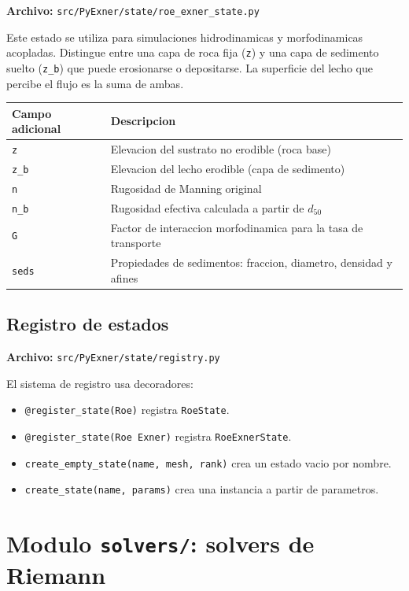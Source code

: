 \documentclass[11pt,a4paper]{article}
\newcommand{\code}[1]{\texttt{#1}}
\begin{document}
\textbf{Archivo:} \code{src/PyExner/state/roe\_exner\_state.py}

Este estado se utiliza para simulaciones hidrodinamicas y morfodinamicas acopladas. Distingue
entre una capa de roca fija (\code{z}) y una capa de sedimento suelto (\code{z\_b}) que puede
erosionarse o depositarse. La superficie del lecho que percibe el flujo es la suma de ambas.

\begin{longtable}{L{3.4cm}L{11cm}}
\toprule
Campo adicional & Descripcion \\
\midrule
\endhead
\code{z} & Elevacion del sustrato no erodible (roca base) \\
\code{z\_b} & Elevacion del lecho erodible (capa de sedimento) \\
\code{n} & Rugosidad de Manning original \\
\code{n\_b} & Rugosidad efectiva calculada a partir de $d_{50}$ \\
\code{G} & Factor de interaccion morfodinamica para la tasa de transporte \\
\code{seds} & Propiedades de sedimentos: fraccion, diametro, densidad y afines \\
\bottomrule
\end{longtable}

\subsection{Registro de estados}

\textbf{Archivo:} \code{src/PyExner/state/registry.py}

El sistema de registro usa decoradores:

\begin{itemize}[leftmargin=1.6em]
  \item \code{@register\_state(Roe)} registra \code{RoeState}.
  \item \code{@register\_state(Roe Exner)} registra \code{RoeExnerState}.
  \item \code{create\_empty\_state(name, mesh, rank)} crea un estado vacio por nombre.
  \item \code{create\_state(name, params)} crea una instancia a partir de parametros.
\end{itemize}

\section{Modulo \code{solvers/}: solvers de Riemann}
\end{document}
